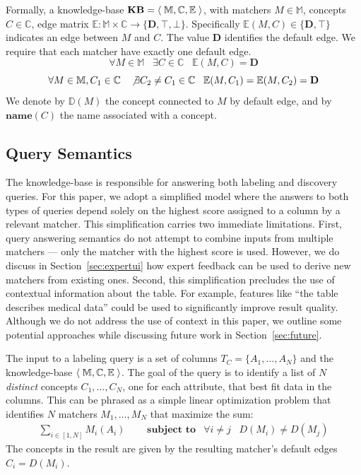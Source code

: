 Formally, a knowledge-base $\textbf{KB} = \left<\;{\mathbb M, \mathbb C, \mathbb E}\;\right>$, with matchers $M \in \mathbb M$, concepts $C \in \mathbb C$, edge matrix $\mathbb E : \mathbb M \times \mathbb C \rightarrow \{\mathbf D, \top, \bot\}$.
Specifically $\mathbb E(M, C) \in \{\mathbf D, \top\}$ indicates an edge between $M$ and $C$.
The value $\mathbf D$ identifies the default edge.
We require that each matcher have exactly one default edge.
$$\forall M \in \mathbb M \;\;\; \exists C \in \mathbb C\;\;\; \mathbb E(M, C) = \mathbf D$$
$$\forall M \in \mathbb M, C_1 \in \mathbb C \;\;\; \not\exists C_2 \neq C_1 \in \mathbb C \;\;\; \mathbb E(M, C_1) = \mathbb E(M, C_2) = \mathbf D$$
We denote by $\mathbb D(M)$ the concept connected to $M$ by default edge, and by $\textbf{name}(C)$ the name associated with a concept.




\subsection{Query Semantics}

The \systemname knowledge-base is responsible for answering both labeling and discovery queries.
For this paper, we adopt a simplified model where the answers to both types of queries depend solely on the highest score assigned to a column by a relevant matcher.
This simplification carries two immediate limitations.
First, query answering semantics do not attempt to combine inputs from multiple matchers --- only the matcher with the highest score is used.
However, we do discuss in Section~\ref{sec:expertui} how expert feedback can be used to derive new matchers from existing ones.
Second, this simplification precludes the use of contextual information about the table.
For example, features like ``the table describes medical data'' could be used to significantly improve result quality.
Although we do not address the use of context in this paper, we outline some potential approaches while discussing future work in Section~\ref{sec:future}.

The input to a labeling query is a set of columns $T_C = \{A_1, \ldots, A_N\}$ and the knowledge-base $\left<\;{\mathbb M, \mathbb C, \mathbb E}\;\right>$. 
The goal of the query is to identify a list of $N$ \emph{distinct} concepts $C_1, \ldots, C_N$, one for each attribute, that best fit data in the columns.
This can be phrased as a simple linear optimization problem that identifies $N$ matchers $M_1, \ldots, M_N$ that maximize the sum:
\begin{align*}
\sum_{i \in [1,N]} M_i(A_i) 
&\;\;\;\;\; \textbf{subject to} &
\forall i \neq j \;\;\; D(M_i) \neq D(M_j)
\end{align*}
The concepts in the result are given by the resulting matcher's default edges $C_i = D(M_i)$.

